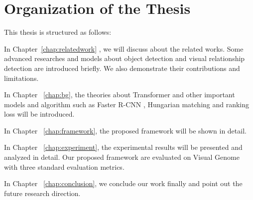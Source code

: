 \section{Organization of the Thesis}
This thesis is structured as follows:

In Chapter~\ref{chap:relatedwork} , we will discuss about the related works. Some advanced researches and models about object detection and visual relationship detection are introduced briefly. We also demonstrate their contributions and limitations.

In Chapter ~\ref{chap:bg}, the theories about Transformer and other important models and algorithm such as Faster R-CNN , Hungarian matching and ranking loss  will be introduced.

In Chapter ~\ref{chap:framework}, the proposed framework will be shown in detail.

In Chapter ~\ref{chap:experiment}, the experimental results will be presented and analyzed in detail. Our proposed framework are evaluated on Visual Genome with three standard evaluation metrics.

In Chapter ~\ref{chap:conclusion}, we conclude our work finally and point out the future research direction.